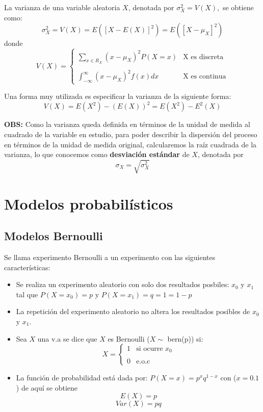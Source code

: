 \documentclass[12pt,twocolumn,a4paper]{report}
\begin{document}
La varianza de una variable aleatoria $X$, denotada por $\sigma_{X}^2 = V(X),$ se obtiene como: 
$$
\sigma_{X}^2 = V(X) = E([X - E(X)]^2) = E([X - \mu_X]^2)
$$
donde
\begin{equation*}
V(X) = \left\{ \begin{array}{lc}
            \sum_{x\in R_X} (x - \mu_X)^2P(X=x)& \text{X es discreta} \\
             \\ \int_{-\infty}^{\infty}(x - \mu_X)^2f(x)dx& \text{X es continua} 
             \end{array}
   \right.
\end{equation*}

Una forma muy utilizada es especificar la varianza de la siguiente forma: 
$$
V(X) = E(X^2) - (E(X))^2 = E(X^2) - E^2(X)
$$

\textbf{OBS:}
Como la varianza queda definida en términos de la unidad de medida al cuadrado de la variable en estudio, para poder describir la dispersión del proceso en términos de la unidad de medida original, calcularemos la raíz cuadrada de la varianza, lo que conocemos como \textbf{desviación estándar} de $X$, denotada por
$$
\sigma_X = \sqrt{\sigma_X ^2}
$$

\chapter*{Modelos probabilísticos}

\section*{Modelos Bernoulli}
Se llama experimento Bernoulli a un experimento con las siguientes características:
\begin{itemize}
\setlength\itemsep{0.001cm}
\item{Se realiza un experimento aleatorio con solo dos resultados posbiles: $x_0$ y $x_1$ tal que $P(X= x_0) = p$ y $P(X=x_1) = q = 1 = 1-p $}
\item{La repetición del experimento aleatorio no altera los resultados posibles de $x_0$ y $x_1$.}
\item{Sea $X$ una v.a se dice que $X$ es Bernoulli ($X \sim $ bern(p)) si:
\begin{equation*}
X= \left\{ \begin{array}{lc}
             1 & \text{si ocurre $x_0$} \\
             \\ 0 & \text{e.o.c} 
             \end{array}
   \right.
\end{equation*}}
\item{La función de probabilidad está dada por: $P(X = x) = p^x q^{1-x}$ con ($x = 0.1$) de aquí se obtiene
$$
E(X) = p
$$
$$
Var(X) = pq
$$}
\end{itemize}
\end{document}

